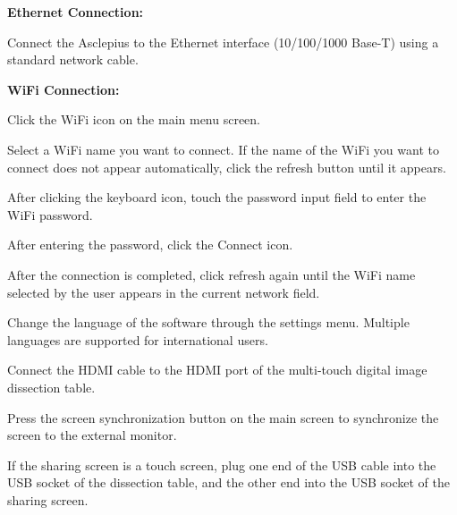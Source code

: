\documentclass[11pt,a4paper]{article}
\begin{document}



\textbf{Ethernet Connection:}

Connect the Asclepius to the Ethernet interface (10/100/1000 Base-T) using a
standard network cable.

\textbf{WiFi Connection:}

\begin{tbkSteps}
  \item Click the WiFi icon  on the main menu screen.
  \item Select a WiFi name you want to connect. If the name of the WiFi
        you want to connect does not appear automatically, click the
        refresh button  until it appears.
  \item After clicking the keyboard icon, touch the password input field
        to enter the WiFi password.
  \item After entering the password, click the Connect icon.
  \item After the connection is completed, click refresh again until the
        WiFi name selected by the user appears in the current network field.
\end{tbkSteps}



Change the language of the software through the settings menu. Multiple languages
are supported for international users.



\begin{tbkSteps}
  \item Connect the HDMI cable to the HDMI port of the multi-touch digital
        image dissection table.
  \item Press the screen synchronization button on the main screen to
        synchronize the screen to the external monitor.
  \item If the sharing screen is a touch screen, plug one end of the USB
        cable into the USB socket of the dissection table, and the other
        end into the USB socket of the sharing screen.
\end{tbkSteps}
\end{document}
